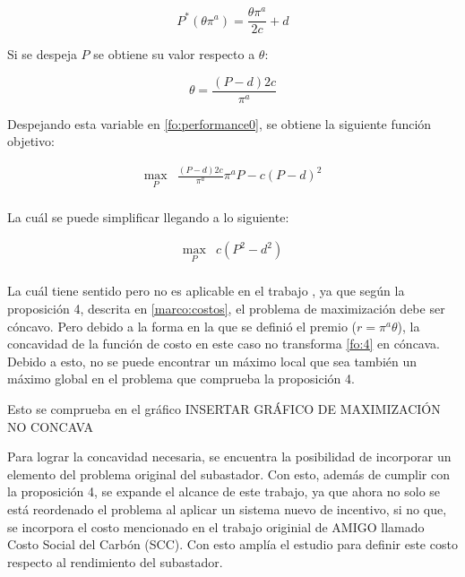 $$P^*(\theta \pi^a) = \frac{\theta \pi^a}{2c}+d$$

Si se despeja $P$ se obtiene su valor respecto a $\theta$:

$$\theta=\frac{(P-d)2c}{\pi^a}$$

Despejando esta variable en \ref{fo:performance0}, se obtiene la siguiente función objetivo:


\begin{equation}
\begin{array}{rrclcl}
    \displaystyle \max_{P} & \frac{(P-d)2c}{\pi^a} \pi^{a}P - c(P-d)^2  \label{fo:3}\\
\end{array}
\end{equation}

La cuál se puede simplificar llegando a lo siguiente:

\begin{equation}
\begin{array}{rrclcl}
    \displaystyle \max_{P} & c(P^{2}-d^{2}) \label{fo:4}\\
\end{array}
\end{equation}

La cuál tiene sentido pero no es aplicable en el trabajo , ya que según la proposición 4, descrita en \ref{marco:costos}, el problema de maximización debe ser cóncavo. Pero debido a la forma en la que se definió el premio ($r=\pi^{a}\theta$), la concavidad de la función de costo en este caso no transforma \ref{fo:4} en cóncava. Debido a esto, no se puede encontrar un máximo local que sea también un máximo global en el problema que comprueba la proposición 4.
\vspace{2.5mm}

Esto se comprueba en el gráfico INSERTAR GRÁFICO DE MAXIMIZACIÓN NO CONCAVA
\vspace{2.5mm}

Para lograr la concavidad necesaria, se encuentra la posibilidad de incorporar un elemento del problema original del subastador. Con esto, además de cumplir con la proposición 4, se expande el alcance de este trabajo, ya que ahora no solo se está reordenado el problema al aplicar un sistema nuevo de incentivo, si no que, se incorpora el costo mencionado en el trabajo originial de AMIGO llamado Costo Social del Carbón (SCC). Con esto amplía el estudio para definir este costo respecto al rendimiento del subastador.
\vspace{2.5mm}

